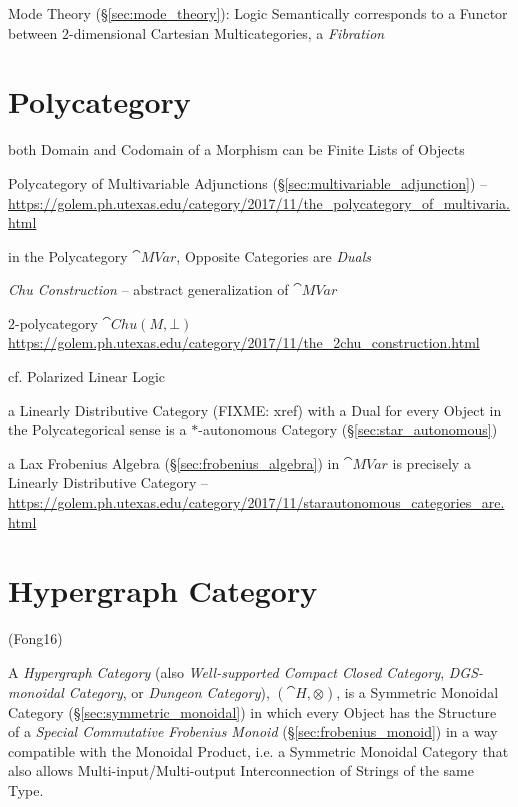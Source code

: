 Mode Theory (\S\ref{sec:mode_theory}): Logic Semantically corresponds
to a Functor between $2$-dimensional Cartesian Multicategories, a
\emph{Fibration}



\section{Polycategory}\label{sec:polycategory}

both Domain and Codomain of a Morphism can be Finite Lists of Objects

Polycategory of Multivariable Adjunctions
(\S\ref{sec:multivariable_adjunction}) --
\url{https://golem.ph.utexas.edu/category/2017/11/the_polycategory_of_multivaria.html}

in the Polycategory $\cat{MVar}$, Opposite Categories are \emph{Duals}


\emph{Chu Construction} -- abstract generalization of $\cat{MVar}$

$2$-polycategory $\cat{Chu}(M,\bot)$
\url{https://golem.ph.utexas.edu/category/2017/11/the_2chu_construction.html}

cf. Polarized Linear Logic

a Linearly Distributive Category (FIXME: xref) with a Dual for every Object in
the Polycategorical sense is a $*$-autonomous Category
(\S\ref{sec:star_autonomous})

a Lax Frobenius Algebra (\S\ref{sec:frobenius_algebra}) in $\cat{MVar}$ is
precisely a Linearly Distributive Category
--\url{https://golem.ph.utexas.edu/category/2017/11/starautonomous_categories_are.html}



\section{Hypergraph Category}\label{sec:hypergraph_category}

(Fong16)

A \emph{Hypergraph Category} (also \emph{Well-supported Compact Closed
  Category}, \emph{DGS-monoidal Category}, or \emph{Dungeon
  Category}), $(\cat{H}, \otimes)$, is a Symmetric Monoidal Category
(\S\ref{sec:symmetric_monoidal}) in which every Object has the
Structure of a \emph{Special Commutative Frobenius Monoid}
(\S\ref{sec:frobenius_monoid}) in a way compatible with the Monoidal
Product, i.e. a Symmetric Monoidal Category that also allows
Multi-input/Multi-output Interconnection of Strings of the same Type.

